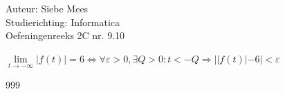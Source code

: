 \documentclass[a4paper]{article}
\begin{document}
  
\noindent \large Auteur: Siebe Mees \\
\noindent \large Studierichting: Informatica\\
\noindent \large Oefeningenreeks 2C nr. 9.10\\

\medskip

\normalsize

$\lim\limits_{t\rightarrow -\infty} |f(t)| = 6 \Leftrightarrow \forall \varepsilon > 0, \exists Q > 0 : t < -Q \Rightarrow | |f(t)| - 6 | < \varepsilon$\\

\begin{thebibliography}{999}
\end{thebibliography}
\end{document}
